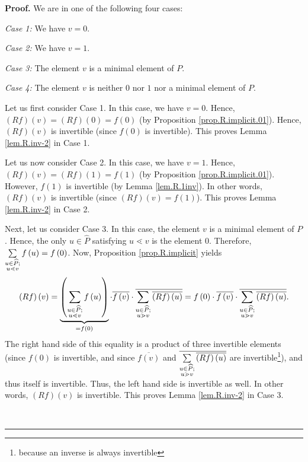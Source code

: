 \documentclass[numbers=enddot,12pt,final,onecolumn,notitlepage]{scrartcl}%
\theoremstyle{definition}
\newenvironment{verlong}{}{}
\newenvironment{proof}[1][Proof]{\noindent\textbf{#1.} }{\ \rule{0.5em}{0.5em}}
\let\sumnonlimits\sum
\renewcommand{\sum}{\sumnonlimits\limits}
\begin{document}
\begin{verlong}
\begin{proof}
We are in one of the following four cases:

\textit{Case 1:} We have $v=0$.

\textit{Case 2:} We have $v=1$.

\textit{Case 3:} The element $v$ is a minimal element of $P$.

\textit{Case 4:} The element $v$ is neither $0$ nor $1$ nor a minimal element
of $P$.

Let us first consider Case 1. In this case, we have $v=0$. Hence, $\left(
Rf\right)  \left(  v\right)  =\left(  Rf\right)  \left(  0\right)  =f\left(
0\right)  $ (by Proposition \ref{prop.R.implicit.01}). Hence, $\left(
Rf\right)  \left(  v\right)  $ is invertible (since $f\left(  0\right)  $ is
invertible). This proves Lemma \ref{lem.R.inv-2} in Case 1.

Let us now consider Case 2. In this case, we have $v=1$. Hence, $\left(
Rf\right)  \left(  v\right)  =\left(  Rf\right)  \left(  1\right)  =f\left(
1\right)  $ (by Proposition \ref{prop.R.implicit.01}). However, $f\left(
1\right)  $ is invertible (by Lemma \ref{lem.R.1inv}). In other words,
$\left(  Rf\right)  \left(  v\right)  $ is invertible (since $\left(
Rf\right)  \left(  v\right)  =f\left(  1\right)  $). This proves Lemma
\ref{lem.R.inv-2} in Case 2.

Next, let us consider Case 3. In this case, the element $v$ is a minimal
element of $P$. Hence, the only $u\in\widehat{P}$ satisfying $u\lessdot v$ is
the element $0$. Therefore, $\sum\limits_{\substack{u\in\widehat{P}%
;\\u\lessdot v}}f\left(  u\right)  =f\left(  0\right)  $. Now, Proposition
\ref{prop.R.implicit} yields%
\[
\left(  Rf\right)  \left(  v\right)  =\underbrace{\left(  \sum
\limits_{\substack{u\in\widehat{P};\\u\lessdot v}}f\left(  u\right)  \right)
}_{=f\left(  0\right)  }\cdot\overline{f\left(  v\right)  }\cdot\overline
{\sum\limits_{\substack{u\in\widehat{P};\\u\gtrdot v}}\overline{\left(
Rf\right)  \left(  u\right)  }}=f\left(  0\right)  \cdot\overline{f\left(
v\right)  }\cdot\overline{\sum\limits_{\substack{u\in\widehat{P};\\u\gtrdot
v}}\overline{\left(  Rf\right)  \left(  u\right)  }}.
\]
The right hand side of this equality is a product of three invertible elements
(since $f\left(  0\right)  $ is invertible, and since $\overline{f\left(
v\right)  }$ and $\overline{\sum\limits_{\substack{u\in\widehat{P};\\u\gtrdot
v}}\overline{\left(  Rf\right)  \left(  u\right)  }}$ are
invertible\footnote{because an inverse is always invertible}), and thus itself
is invertible. Thus, the left hand side is invertible as well. In other words,
$\left(  Rf\right)  \left(  v\right)  $ is invertible. This proves Lemma
\ref{lem.R.inv-2} in Case 3.


\end{proof}
\end{verlong}
\end{document}
